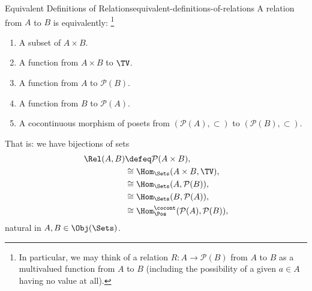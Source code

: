 \begin{remark}{Equivalent Definitions of Relations}{equivalent-definitions-of-relations}%
    A relation from $A$ to $B$ is equivalently:%
    \footnote{%
        In particular, we may think of a relation $R\colon A\to\mathcal{P}(B)$ from $A$ to $B$ as a multivalued function from $A$ to $B$ (including the possibility of a given $a\in A$ having no value at all).
        \par\vspace*{-1.75\baselineskip}
    }%
    \begin{enumerate}
        \item\label{equivalent-definitions-of-relations-item-1}A subset of $A\times B$.
        \item\label{equivalent-definitions-of-relations-item-2}A function from $A\times B$                                                  to $\TV$.
        \item\label{equivalent-definitions-of-relations-item-3}A function from $A$                                                          to $\mathcal{P}(B)$.
        \item\label{equivalent-definitions-of-relations-item-4}A function from $B$                                                          to $\mathcal{P}(A)$.
        \item\label{equivalent-definitions-of-relations-item-5}A cocontinuous morphism of posets from $(\mathcal{P}(A),\subset)$ to $(\mathcal{P}(B),\subset)$.
    \end{enumerate}
    That is: we have bijections of sets
    \begin{align*}
        \Rel(A,B) &\defeq \mathcal{P}(A\times B),\\
                  &\cong  \Hom_{\Sets}(A\times B,\TV),\\
                  &\cong  \Hom_{\Sets}(A,\mathcal{P}(B)),\\
                  &\cong  \Hom_{\Sets}(B,\mathcal{P}(A)),\\
                  &\cong  \Hom^{\cocont}_{\Pos}(\mathcal{P}(A),\mathcal{P}(B)),
    \end{align*}
    natural in $A,B\in\Obj(\Sets)$.
\end{remark}
